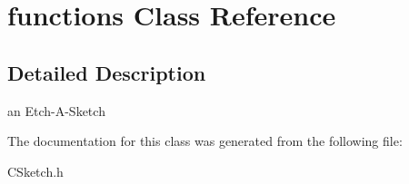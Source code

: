 \hypertarget{classfunctions}{}\section{functions Class Reference}
\label{classfunctions}


\subsection{Detailed Description}
an Etch-\/\+A-\/\+Sketch 

The documentation for this class was generated from the following file\+:\begin{DoxyCompactItemize}
\item 
C\+Sketch.\+h\end{DoxyCompactItemize}
